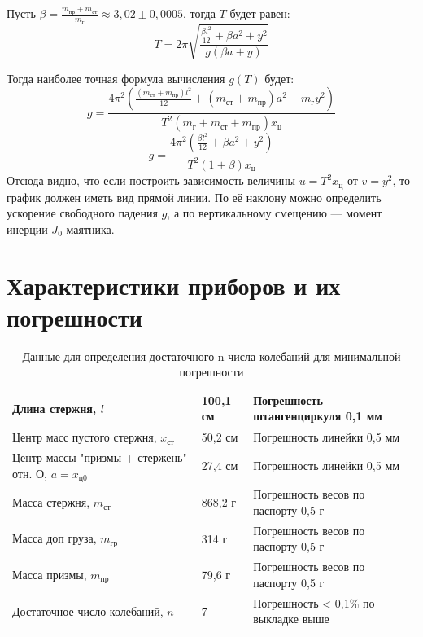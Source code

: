 \documentclass[a4paper]{article}
\begin{document}
Пусть $\beta = \frac{m_{\text{пр}} + m_{\text{ст}}}{m_{\text{г}}} \approx 3,02 \pm 0,0005$, тогда $T$ будет равен:
\[T = 2\pi \sqrt{\frac{\frac{\beta l^2}{12} + \beta a^2 + y^2}{g \left( \beta a + y \right)}}\]

Тогда наиболее точная формула вычисления $g(T)$ будет:
\[g = \frac{4\pi^2(\frac{(m_{\text{ст}} + m_{\text{пр}})l^2}{12} + (m_{\text{ст}} + m_{\text{пр}})a^2 + m_{\text{г}}y^2)}{T^2 (m_{\text{г}} + m_{\text{ст}} + m_{\text{пр}}) x_{\text{ц}}}\]
\[g = \frac{4\pi^2(\frac{\beta l^2}{12} + \beta a^2 + y^2)}{T^2 (1 + \beta) x_{\text{ц}}}\]
Отсюда видно, что если построить зависимость величины $u = T^2 x_{\text{ц}}$  от $v = y^2$, то график должен иметь вид прямой линии. По её наклону можно определить ускорение свободного падения $g$, а по вертикальному смещению — момент инерции $J_{0}$ маятника.
\newpage
\section{Характеристики приборов и их погрешности}


\begin{table}[!h]
\begin{center}
\begin{tabular}{|l|l|l|}
\hline
Длина стержня, $l$                              & 100,1 см & Погрешность штангенциркуля 0,1 мм    \\ \hline
Центр масс пустого стержня, $x_{\text{ст}}$                 & 50,2 см  & Погрешность линейки 0,5 мм           \\ \hline
Центр массы "призмы + стержень" отн. О, $a = x_{\text{ц0}}$ & 27,4 см  & Погрешность линейки 0,5 мм           \\ \hline
Масса стержня, $m_{\text{ст}}$            & 868,2 г  & Погрешность весов по паспорту 0,5 г  \\ \hline
Масса доп груза, $m_{\text{гр}}$          & 314 г    & Погрешность весов по паспорту 0,5 г \\ \hline
Масса призмы, $m_{\text{пр}}$             & 79,6 г   & Погрешность весов по паспорту 0,5 г \\ \hline
Достаточное число колебаний, $n$ & 7 & Погрешность < 0,1\% по выкладке выше \\ \hline 
\end{tabular}
\caption{Данные для определения достаточного n числа колебаний для минимальной погрешности}
\end{center}
\end{table}
\end{document}
